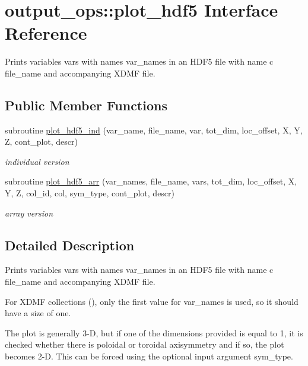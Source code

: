 \hypertarget{interfaceoutput__ops_1_1plot__hdf5}{}\section{output\+\_\+ops\+:\+:plot\+\_\+hdf5 Interface Reference}
\label{interfaceoutput__ops_1_1plot__hdf5}


Prints variables {\ttfamily vars} with names {\ttfamily var\+\_\+names} in an H\+D\+F5 file with name c file\+\_\+name and accompanying X\+D\+MF file.  


\subsection*{Public Member Functions}
\begin{DoxyCompactItemize}
\item 
subroutine \hyperlink{interfaceoutput__ops_1_1plot__hdf5_a70787d16f320d130c3ab67128075d7a1}{plot\+\_\+hdf5\+\_\+ind} (var\+\_\+name, file\+\_\+name, var, tot\+\_\+dim, loc\+\_\+offset, X, Y, Z, cont\+\_\+plot, descr)
\begin{DoxyCompactList}\small\item\em individual version \end{DoxyCompactList}\item 
subroutine \hyperlink{interfaceoutput__ops_1_1plot__hdf5_aabeeacb6f9aab1fb21d226e6a315e3d1}{plot\+\_\+hdf5\+\_\+arr} (var\+\_\+names, file\+\_\+name, vars, tot\+\_\+dim, loc\+\_\+offset, X, Y, Z, col\+\_\+id, col, sym\+\_\+type, cont\+\_\+plot, descr)
\begin{DoxyCompactList}\small\item\em array version \end{DoxyCompactList}\end{DoxyCompactItemize}


\subsection{Detailed Description}
Prints variables {\ttfamily vars} with names {\ttfamily var\+\_\+names} in an H\+D\+F5 file with name c file\+\_\+name and accompanying X\+D\+MF file. 

For X\+D\+MF collections (\cite{xdmf}), only the first value for {\ttfamily var\+\_\+names} is used, so it should have a size of one.

The plot is generally 3-\/D, but if one of the dimensions provided is equal to 1, it is checked whether there is poloidal or toroidal axisymmetry and if so, the plot becomes 2-\/D. This can be forced using the optional input argument {\ttfamily sym\+\_\+type}.

